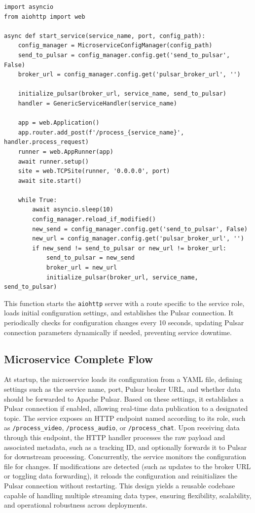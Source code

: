 \begin{lstlisting}[breaklines=true,basicstyle=\small\ttfamily,frame=single]
import asyncio
from aiohttp import web

async def start_service(service_name, port, config_path):
    config_manager = MicroserviceConfigManager(config_path)
    send_to_pulsar = config_manager.config.get('send_to_pulsar', False)
    broker_url = config_manager.config.get('pulsar_broker_url', '')

    initialize_pulsar(broker_url, service_name, send_to_pulsar)
    handler = GenericServiceHandler(service_name)

    app = web.Application()
    app.router.add_post(f'/process_{service_name}', handler.process_request)
    runner = web.AppRunner(app)
    await runner.setup()
    site = web.TCPSite(runner, '0.0.0.0', port)
    await site.start()

    while True:
        await asyncio.sleep(10)
        config_manager.reload_if_modified()
        new_send = config_manager.config.get('send_to_pulsar', False)
        new_url = config_manager.config.get('pulsar_broker_url', '')
        if new_send != send_to_pulsar or new_url != broker_url:
            send_to_pulsar = new_send
            broker_url = new_url
            initialize_pulsar(broker_url, service_name, send_to_pulsar)
\end{lstlisting}

This function starts the \texttt{aiohttp} server with a route specific to the service role, loads initial configuration settings, and establishes the Pulsar connection. It periodically checks for configuration changes every 10 seconds, updating Pulsar connection parameters dynamically if needed, preventing service downtime.

\subsection{Microservice Complete Flow}
At startup, the microservice loads its configuration from a YAML file, defining settings such as the service name, port, Pulsar broker URL, and whether data should be forwarded to Apache Pulsar. Based on these settings, it establishes a Pulsar connection if enabled, allowing real-time data publication to a designated topic. The service exposes an HTTP endpoint named according to its role, such as \texttt{/process\_video}, \texttt{/process\_audio}, or \texttt{/process\_chat}. Upon receiving data through this endpoint, the HTTP handler processes the raw payload and associated metadata, such as a tracking ID, and optionally forwards it to Pulsar for downstream processing. Concurrently, the service monitors the configuration file for changes. If modifications are detected (such as updates to the broker URL or toggling data forwarding), it reloads the configuration and reinitializes the Pulsar connection without restarting. This design yields a reusable codebase capable of handling multiple streaming data types, ensuring flexibility, scalability, and operational robustness across deployments.


